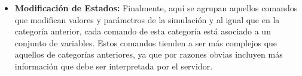 \begin{itemize}
    \item \textbf{Modificación de Estados:} Finalmente, aquí se agrupan aquellos comandos que modifican valores y parámetros de la simulación y al igual que en la categoría anterior, cada comando de esta categoría está asociado a un conjunto de variables. Estos comandos tienden a ser más complejos que aquellos de categorías anteriores, ya que por razones obvias incluyen más información que debe ser interpretada por el servidor.    
\end{itemize}